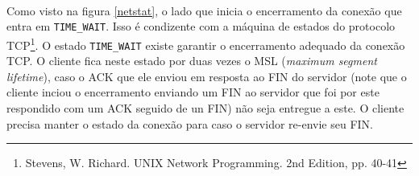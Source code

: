\documentclass[a4paper,10pt,oneside,final,titlepage,onecolumn]{article}
\begin{document}
\paragraph{}Como visto na figura \ref{netstat}, o lado que inicia o encerramento da conexão que entra em \verb|TIME_WAIT|. Isso é condizente com a máquina de estados do protocolo TCP\footnote{Stevens, W. Richard. UNIX Network Programming. 2nd Edition, pp. 40-41}. O estado \verb|TIME_WAIT| existe garantir o encerramento adequado da conexão TCP. O cliente fica neste estado por duas vezes o MSL (\emph{maximum segment lifetime}), caso o ACK que ele enviou em resposta ao FIN do servidor (note que o cliente inciou o encerramento enviando um FIN ao servidor que foi por este respondido com um ACK seguido de un FIN) não seja entregue a este. O cliente precisa manter o estado da conexão para caso o servidor re-envie seu FIN.
\end{document}
